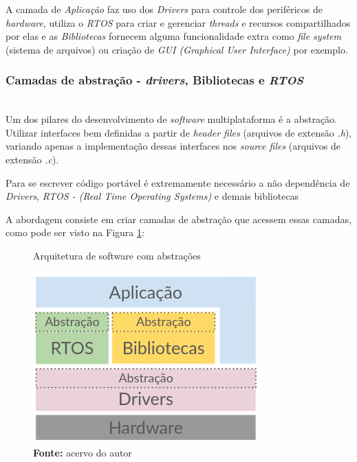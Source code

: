\documentclass[times, twoside, watermark]{artigo}
\begin{document}
A camada de \textit{Aplicação} faz uso dos \textit{Drivers} para controle dos
periféricos de \textit{hardware}, utiliza o \textit{RTOS} para criar e gerenciar
\textit{threads} e recursos compartilhados por elas e as \textit{Bibliotecas}
fornecem alguma funcionalidade extra como \textit{file system} (sistema de arquivos)
ou criação de \textit{GUI (Graphical User Interface)} por exemplo.

\subsubsection{Camadas de abstração - \textit{drivers}, Bibliotecas e \textit{RTOS}}\hfill\\

Um dos pilares do desenvolvimento de \textit{software} multiplataforma é a abstração.
Utilizar interfaces bem definidas a partir de \textit{header files} (arquivos de
extensão \textit{.h}), variando apenas a implementação dessas interfaces nos
\textit{source files} (arquivos de extensão \textit{.c}).

Para se escrever código portável é extremamente necessário a não dependência de
\textit{Drivers}, \textit{RTOS - (Real Time Operating Systems)} e demais bibliotecas

A abordagem consiste em criar camadas de abstração que acessem essas camadas, como
pode ser visto na Figura \ref{fig:arch-abs}: \hfill\\

\begin{figure}[H]
  \centering
  \caption{Arquitetura de software com abstrações}
  \includegraphics[width=0.9\linewidth]{images/arch-abs.png}
  \caption*{\newline\textbf{Fonte:} acervo do autor}
  \label{fig:arch-abs}
\end{figure}
\end{document}
